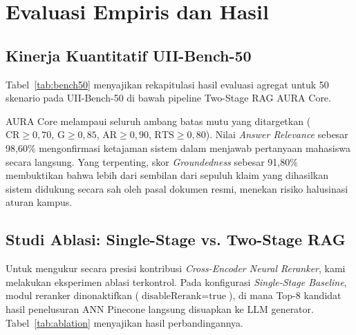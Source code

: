 \documentclass[conference]{IEEEtran}
\begin{document}
\section{Evaluasi Empiris dan Hasil}

\subsection{Kinerja Kuantitatif UII-Bench-50}
Tabel~\ref{tab:bench50} menyajikan rekapitulasi hasil evaluasi agregat untuk 50 skenario pada UII-Bench-50 di bawah pipeline Two-Stage RAG AURA Core.

\begin{table}[htbp]
\caption{Kinerja Agregat UII-Bench-50 pada Lima Klaster Regulasi (Pipeline Two-Stage RAG)}
\label{tab:bench50}
\centering
{}
\end{table}

AURA Core melampaui seluruh ambang batas mutu yang ditargetkan ($\text{CR} \ge 0,70$, $\text{G} \ge 0,85$, $\text{AR} \ge 0,90$, $\text{RTS} \ge 0,80$). Nilai \textit{Answer Relevance} sebesar 98,60\% mengonfirmasi ketajaman sistem dalam menjawab pertanyaan mahasiswa secara langsung. Yang terpenting, skor \textit{Groundedness} sebesar 91,80\% membuktikan bahwa lebih dari sembilan dari sepuluh klaim yang dihasilkan sistem didukung secara sah oleh pasal dokumen resmi, menekan risiko halusinasi aturan kampus.

\subsection{Studi Ablasi: Single-Stage vs. Two-Stage RAG}
Untuk mengukur secara presisi kontribusi \textit{Cross-Encoder Neural Reranker}, kami melakukan eksperimen ablasi terkontrol. Pada konfigurasi \textit{Single-Stage Baseline}, modul reranker dinonaktifkan ($\text{disableRerank} = \text{true}$), di mana Top-8 kandidat hasil penelusuran ANN Pinecone langsung disuapkan ke LLM generator. Tabel~\ref{tab:ablation} menyajikan hasil perbandingannya.
\end{document}
